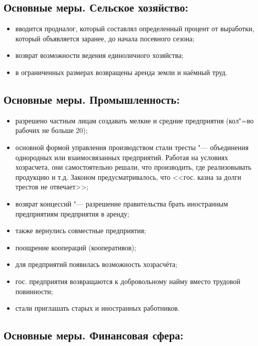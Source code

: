 \subsection{Основные меры. Сельское хозяйство:}

\begin{itemize}
    \item вводится продналог, который составлял определенный процент от выработки, который объявляется заранее, до начала посевного сезона;
    \item возврат возможности ведения единоличного хозяйства;
    \item в ограниченных размерах возвращены аренда земли и наёмный труд.
\end{itemize}

\subsection{Основные меры. Промышленность:}

\begin{itemize}
    \item разрешено частным лицам создавать мелкие и средние предприятия (кол"=во рабочих не больше 20);
    \item основной формой управления производством стали тресты "--- объединения однородных или взаимосвязанных предприятий. Работая на условиях хозрасчета, они самостоятельно решали, что производить, где реализовывать продукцию и т.д. Законом предусматривалось, что <<гос. казна за долги трестов не отвечает>>;
    \item возврат концессий "--- разрешение правительства брать иностранным предприятиям предприятия в аренду;
    \item также вернулись совместные предприятия;
    \item поощрение коопераций (кооперативов);
    \item для предприятий появилась возможность хозрасчёта;
    \item гос. предприятия возвращаются к добровольному найму вместо трудовой повинности;
    \item стали приглашать старых и иностранных работников.
\end{itemize}

\subsection{Основные меры. Финансовая сфера:}

